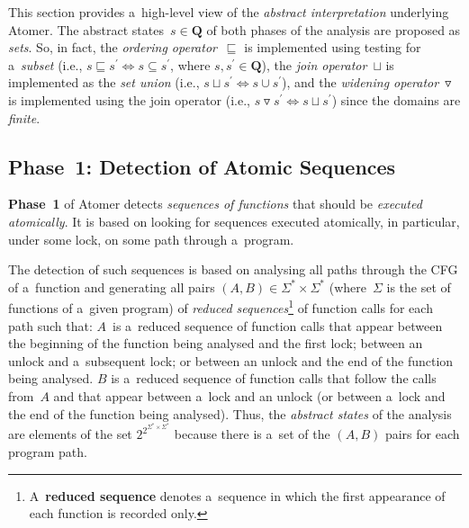 \documentclass{ExcelAtFIT}
\theoremstyle{definition}
\begin{document}
This section provides a~high-level view of the \emph{abstract interpretation} underlying Atomer. The abstract states~$ s \in \boldsymbol{Q} $ of both phases of the analysis are proposed as \emph{sets}. So, in fact, the \emph{ordering operator}~$ \sqsubseteq $ is implemented using testing for a~\emph{subset} (i.e., $ s \sqsubseteq s^\prime \Leftrightarrow s \subseteq s^\prime $, where $ s, s^\prime \in \boldsymbol{Q} $), the \emph{join operator}~$ \sqcup $ is implemented as the \emph{set union} (i.e., $ s \sqcup s^\prime \Leftrightarrow s \cup s^\prime $), and the \emph{widening operator}~$ \triangledown $ is implemented using the join operator (i.e., $ s \triangledown s^\prime \Leftrightarrow s \sqcup s^\prime $) since the domains are \emph{finite}.

\subsection{Phase~1: Detection of Atomic Sequences}

\textbf{Phase~1} of Atomer detects \emph{sequences of functions} that should be \emph{executed atomically}. It is based on looking for sequences executed atomically, in particular, under some lock, on some path through a~program.

The detection of such sequences is based on analysing all paths through the CFG of a~function and generating all pairs $ {(A, B)} \in {\Sigma^* \times \Sigma^*} $ (where~$ \Sigma $ is the set of functions of a~given program) of \emph{reduced sequences}\footnote{A~\textbf{reduced sequence} denotes a~sequence in which the first appearance of each function is recorded only.} of function calls for each path such that: $ A $~is a~reduced sequence of function calls that appear between the beginning of the function being analysed and the first lock; between an unlock and a~subsequent lock; or between an unlock and the end of the function being analysed. $ B $ is a~reduced sequence of function calls that follow the calls from~$ A $ and that appear between a~lock and an unlock (or between a~lock and the end of the function being analysed). Thus, the \emph{abstract states} of the analysis are elements of the set $ 2^{2^{\Sigma^* \times \Sigma^*}} $ because there is a~set of the ${ (A, B) }$ pairs for each program path.
\end{document}
